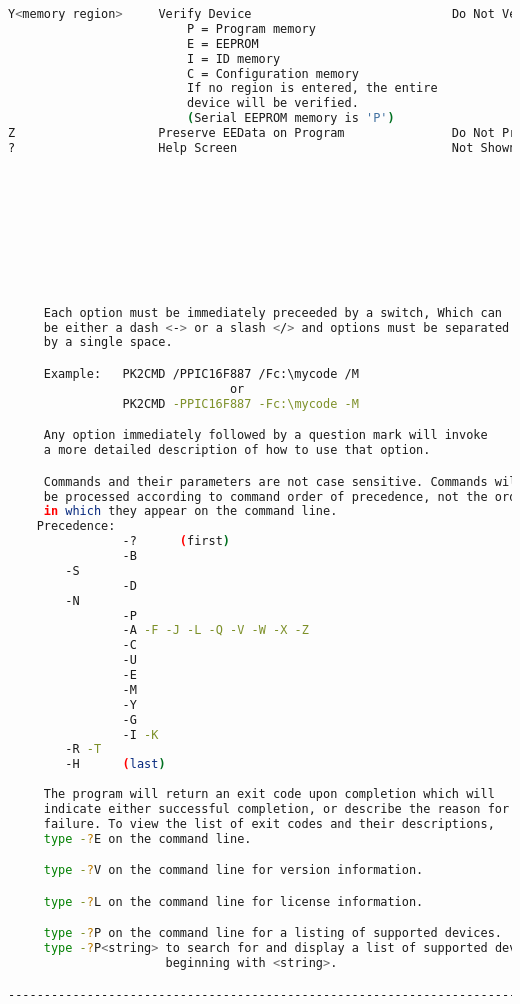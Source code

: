 \begin{center}
\begin{lstlisting}[language=bash]
Y<memory region>     Verify Device                            Do Not Verify
                         P = Program memory
                         E = EEPROM
                         I = ID memory
                         C = Configuration memory
                         If no region is entered, the entire
                         device will be verified.
                         (Serial EEPROM memory is 'P')
Z                    Preserve EEData on Program               Do Not Preserve
?                    Help Screen                              Not Shown









     Each option must be immediately preceeded by a switch, Which can
     be either a dash <-> or a slash </> and options must be separated
     by a single space.

     Example:   PK2CMD /PPIC16F887 /Fc:\mycode /M
                               or
                PK2CMD -PPIC16F887 -Fc:\mycode -M

     Any option immediately followed by a question mark will invoke
     a more detailed description of how to use that option.

     Commands and their parameters are not case sensitive. Commands will
     be processed according to command order of precedence, not the order
     in which they appear on the command line. 
    Precedence:
                -?      (first)
                -B
        -S
                -D	
        -N
                -P
                -A -F -J -L -Q -V -W -X -Z
                -C
                -U
                -E
                -M
                -Y
                -G
                -I -K   
        -R -T
        -H      (last)
        
     The program will return an exit code upon completion which will
     indicate either successful completion, or describe the reason for
     failure. To view the list of exit codes and their descriptions,
     type -?E on the command line.

     type -?V on the command line for version information.

     type -?L on the command line for license information.

     type -?P on the command line for a listing of supported devices.
     type -?P<string> to search for and display a list of supported devices
                      beginning with <string>.

---------------------------------------------------------------------------
\end{lstlisting}
\end{center}
\newpage
